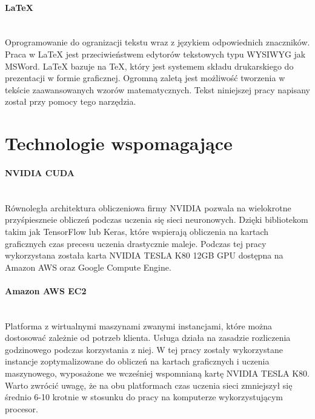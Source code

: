 \paragraph{LaTeX} \mbox{}\\
Oprogramowanie do ogranizacji tekstu wraz z językiem odpowiednich znaczników.
Praca w LaTeX jest przeciwieństwem edytorów tekstowych typu WYSIWYG jak MSWord.
LaTeX bazuje na TeX, który jest systemem składu drukarskiego do prezentacji w
formie graficznej. Ogromną zaletą jest możliwość tworzenia w tekście zaawansowanych
wzorów matematycznych. Tekst niniejszej pracy napisany został przy pomocy tego narzędzia.

\section{Technologie wspomagające}

\paragraph{NVIDIA CUDA} \mbox{}\\
Równoległa architektura obliczeniowa firmy NVIDIA pozwala na wielokrotne
przyśpieszneie obliczeń podczas uczenia się sieci neuronowych. Dzięki bibliotekom
takim jak TensorFlow lub Keras, które wspierają obliczenia na kartach graficznych
czas precesu uczenia drastycznie maleje. Podczas tej pracy wykorzystana została
karta NVIDIA TESLA K80 12GB GPU dostępna na Amazon AWS oraz Google Compute Engine.

\paragraph{Amazon AWS EC2} \mbox{}\\
Platforma z wirtualnymi maszynami zwanymi instancjami, które można dostosować
zależnie od potrzeb klienta. Usługa działa na zasadzie rozliczenia godzinowego
podczas korzystania z niej. W tej pracy zostały wykorzystane instancje
zoptymalizowane do obliczeń na kartach graficznych i uczenia maszynowego,
wyposażone we wcześniej wspomnianą kartę NVIDIA TESLA K80. Warto
zwrócić uwagę, że na obu platformach czas uczenia sieci zmniejszył się średnio 6-10
krotnie w stosunku do pracy na komputerze wykorzystującym procesor.
